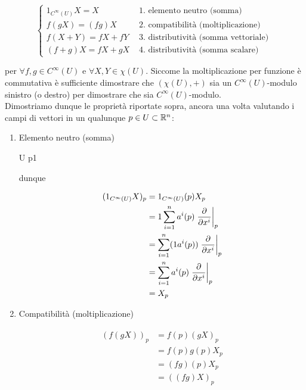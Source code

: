 {\begin{equation}
	\begin{cases}
		1_{C^{\infty}(U)} X = X & \text{ 1. elemento neutro (somma) } \\
		f (g X) = (f g) X & \text{ 2. compatibilità (moltiplicazione) } \\
		f (X+Y) = f X + f Y & \text{ 3. distributività (somma vettoriale) } \\
		(f+g) X = f X + g X & \text{ 4. distributività (somma scalare) }
	\end{cases}
\end{equation}

per $ \forall f,g \in C^{\infty}(U) $ e $ \forall X,Y \in \chi(U) $. Siccome la moltiplicazione per funzione è commutativa è sufficiente dimostrare che $ (\chi(U),+) $ sia un $ C^{\infty}(U) $-modulo sinistro (o destro) per dimostrare che sia $ C^{\infty}(U) $-modulo. \\
Dimostriamo dunque le proprietà riportate sopra, ancora una volta valutando i campi di vettori in un qualunque $ p \in U \subset \mathbb{R}^{n} $:

\begin{enumerate}
	\item Elemento neutro (somma)
	
		{U}{\R}
		{p}{1}
	
	dunque
	
	\begin{align}
		\begin{split}
			(1_{C^{\infty}(U)} X)_{p} &= 1_{C^{\infty}(U)} (p) X_{p} \\
			&= 1 \sum_{i=1}^{n} a^{i} (p) \eval{ \pdv{x^{i}} }_{p} \\
			&= \sum_{i=1}^{n} (1 a^{i} (p)) \eval{ \pdv{x^{i}} }_{p} \\
			&= \sum_{i=1}^{n} a^{i} (p) \eval{ \pdv{x^{i}} }_{p} \\
			&= X_{p}
		\end{split}
	\end{align}
	
	\item Compatibilità (moltiplicazione)
	
	\begin{align}
		\begin{split}
			(f (g X))_{p} &= f (p) (g X)_{p} \\
			&= f (p) g (p) X_{p} \\
			&= (f g) (p) X_{p} \\
			&= ((f g) X)_{p}
		\end{split}
	\end{align}
	

\end{enumerate}}
